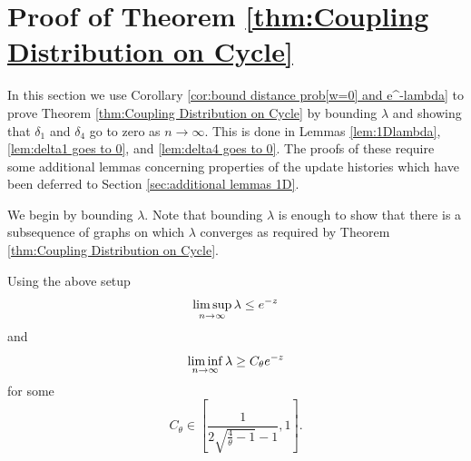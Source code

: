 	\section{Proof of Theorem \ref{thm:Coupling Distribution on Cycle}}
	\label{sec:proof thm coupling cycle}
	In this section we use Corollary \ref{cor:bound distance prob[w=0] and e^-lambda} to prove Theorem \ref{thm:Coupling Distribution on Cycle} by bounding $\lambda$ and showing that $\delta_1$ and $\delta_4$ go to zero as $n \rightarrow \infty$. This is done in Lemmas \ref{lem:1Dlambda}, \ref{lem:delta1 goes to 0}, and \ref{lem:delta4 goes to 0}. The proofs of these require some additional lemmas concerning properties of the update histories which have been deferred to Section \ref{sec:additional lemmas 1D}.

	We begin by bounding $\lambda$. Note that bounding $\lambda$ is enough to show that there is a subsequence of graphs on which $\lambda$ converges as required by Theorem \ref{thm:Coupling Distribution on Cycle}.
	\begin{lemma}
	\label{lem:1Dlambda}
		Using the above setup
		\begin{equation}
			\limsup_{n \rightarrow \infty} \lambda \leq e^{-z}
		\end{equation}
		and
		\begin{equation}
			\liminf_{n \rightarrow \infty} \lambda \geq C_\theta e^{-z}
		\end{equation}
		for some
		\begin{equation}
			C_\theta \in \left[\frac{1}{2\sqrt{\frac{4}{\theta} - 1} - 1}, 1\right].
		\end{equation}
	\end{lemma}
